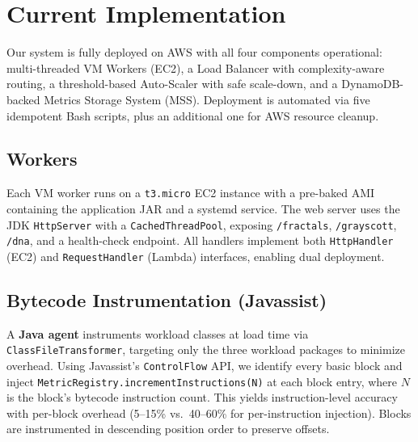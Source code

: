 \documentclass[10pt,twocolumn]{article}
\begin{document}

\section{Current Implementation}

Our system is fully deployed on AWS with all four components operational: multi-threaded VM Workers (EC2), a Load Balancer with complexity-aware routing, a threshold-based Auto-Scaler with safe scale-down, and a DynamoDB-backed Metrics Storage System (MSS). Deployment is automated via five idempotent Bash scripts, plus an additional one for AWS resource cleanup.

\subsection{Workers}

Each VM worker runs on a \texttt{t3.micro} EC2 instance with a pre-baked AMI containing the application JAR and a systemd service. The web server uses the JDK \texttt{HttpServer} with a \texttt{CachedThreadPool}, exposing \texttt{/fractals}, \texttt{/grayscott}, \texttt{/dna}, and a health-check endpoint. All handlers implement both \texttt{HttpHandler} (EC2) and \texttt{RequestHandler} (Lambda) interfaces, enabling dual deployment.

\subsection{Bytecode Instrumentation (Javassist)}

A \textbf{Java agent} instruments workload classes at load time via \texttt{ClassFileTransformer}, targeting only the three workload packages to minimize overhead. Using Javassist's \texttt{ControlFlow} API, we identify every basic block and inject \texttt{MetricRegistry.incrementInstructions(N)} at each block entry, where $N$ is the block's bytecode instruction count. This yields instruction-level accuracy with per-block overhead (5--15\% vs.\ 40--60\% for per-instruction injection). Blocks are instrumented in descending position order to preserve offsets.
\end{document}
